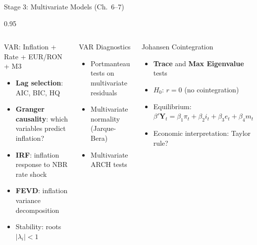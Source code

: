 \documentclass[9pt, aspectratio=169, t]{beamer}
\begin{document}
\begin{frame}{Stage 3: Multivariate Models (Ch.\ 6--7)}
    \vspace{-0.4cm}
    \begin{cminipage}{0.95\textwidth}
        {\scriptsize
        \begin{columns}[T]
            \begin{block}{VAR: Inflation + Rate + EUR/RON + M3}
                \begin{itemize}\setlength{\itemsep}{0pt}
                    \item \textbf{Lag selection}: AIC, BIC, HQ
                    \item \textbf{Granger causality}: which variables predict inflation?
                    \item \textbf{IRF}: inflation response to NBR rate shock
                    \item \textbf{FEVD}: inflation variance decomposition
                    \item Stability: roots $|\lambda_i| < 1$
                \end{itemize}
            \end{block}

            \vspace{0.05cm}

            \begin{exampleblock}{VAR Diagnostics}
                \begin{itemize}\setlength{\itemsep}{0pt}
                    \item Portmanteau tests on multivariate residuals
                    \item Multivariate normality (Jarque-Bera)
                    \item Multivariate ARCH tests
                \end{itemize}
            \end{exampleblock}

            \begin{alertblock}{Johansen Cointegration}
                \begin{itemize}\setlength{\itemsep}{0pt}
                    \item \textbf{Trace} and \textbf{Max Eigenvalue} tests
                    \item $H_0$: $r = 0$ (no cointegration)
                    \item Equilibrium: $\beta' \mathbf{Y}_t = \beta_1 \pi_t + \beta_2 i_t + \beta_3 e_t + \beta_4 m_t$
                    \item Economic interpretation: Taylor rule?
                \end{itemize}
            \end{alertblock}


\end{columns}}
\end{cminipage}
\end{frame}
\end{document}
